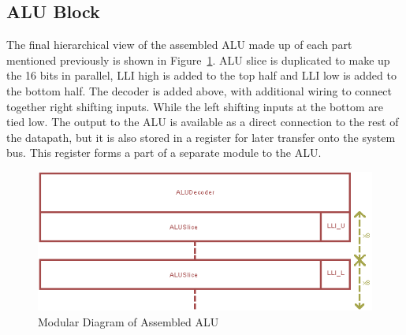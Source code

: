 \subsection{ALU Block}
The final hierarchical view of the assembled ALU made up of each part mentioned previously is shown in Figure~\ref{fig:ALUAssembled}. 
ALU slice is duplicated to make up the 16 bits in parallel, LLI high is added to the top half and LLI low is added to the bottom half. 
The decoder is added above, with additional wiring to connect together right shifting inputs. 
While the left shifting inputs at the bottom are tied low. 
The output to the ALU is available as a direct connection to the rest of the datapath, but it is also stored in a register for later transfer onto the system bus. 
This register forms a part of a separate module to the ALU. 

\begin{figure}[h]
	\centering
	\includegraphics[scale=0.75]{Figures/ALUModular.png}
	\caption{Modular Diagram of Assembled ALU}
	\label{fig:ALUAssembled}
\end{figure}
